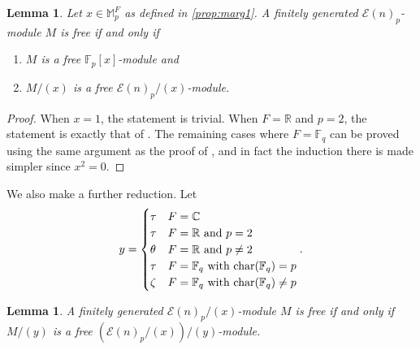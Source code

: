 \documentclass{amsart}
\newtheorem{lemma}[theorem]{Lemma}
\theoremstyle{plain}
\numberwithin{theorem}{section}
\numberwithin{equation}{section}
\numberwithin{figure}{section}
\newcommand{\mC}{{\mathbb C}}
\newcommand{\mF}{{\mathbb F}}
\newcommand{\mM}{{\mathbb M}}
\newcommand{\mR}{{\mathbb R}}
\newcommand{\cE}{{\mathcal E}}
\newcommand{\0}{\langle 0 \rangle }
\begin{document}
\begin{lemma} \label{lem:marg1}
    Let $x \in \mM_p^F$ as defined in \cref{prop:marg1}. A finitely generated $\cE(n)_p$-module $M$ is free if and only if
    \begin{enumerate}
        \item $M$ is a free $\mF_p [x]$-module and
        \item $M/(x)$ is a free $\cE(n)_p / (x)$-module. %
    \end{enumerate}
\end{lemma}
\begin{proof}
    When $x = 1$, the statement is trivial. When $F = \mR$ and $p = 2$, the statement is exactly that of \cite[Lemma 2.1]{BhattacharyaGuillouLi22}. The remaining cases where $F = \mF_q$ can be proved using the same argument as the proof of \cite[Lemma 2.1]{BhattacharyaGuillouLi22}, and in fact the induction there is made simpler since $x^2 = 0$.
\end{proof}

We also make a further reduction. 
 Let 
    \[
    y = \begin{cases}
        \tau & F = \mC \\
        \tau & F = \mR \text{ and } p = 2 \\
        \theta & F = \mR \text{ and } p \neq 2 \\
        \tau & F = \mF_q \text{ with } \textup{char}(\mF_q) = p \\
        \zeta &  F = \mF_q \text{ with } \textup{char}(\mF_q) \neq p 
    \end{cases}.
    \]
\begin{lemma} \label{lem:marg2}
    A finitely generated $\cE(n)_p / (x)$-module $M$ is free if and only if $M /(y)$ is a free $(\cE(n)_p/(x))/(y)$-module.
\end{lemma}
\end{document}

